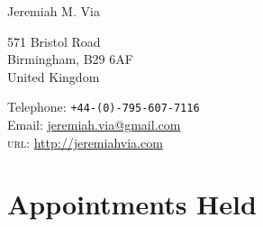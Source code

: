 \documentclass[10pt, a4paper]{article}
\newcommand{\years}[1]{\marginnote{\scriptsize #1}}
\begin{document}
{\LARGE Jeremiah M. Via}\\[1cm]
\begin{minipage}[t]{0.55\textwidth}
  571 Bristol Road\\
  Birmingham, B29 6AF\\
  United Kingdom
\end{minipage}
\begin{minipage}[t]{0.4\textwidth}
  Telephone: \texttt{+44-(0)-795-607-7116}\\
  Email: \href{mailto:jeremiah.via@gmail.com}{jeremiah.via@gmail.com}\\
  \textsc{url}: \href{http://jeremiahvia.com}{http://jeremiahvia.com}
\end{minipage}






\section*{Appointments Held}

\end{document}
